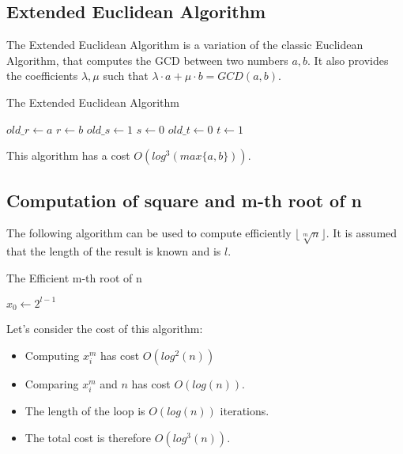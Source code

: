 \subsection{Extended Euclidean Algorithm}
The Extended Euclidean Algorithm is a variation of the classic Euclidean Algorithm, that computes the GCD between two numbers $a, b$. \newline
It also provides the coefficients $\lambda, \mu$ such that $\lambda \cdot a + \mu \cdot b = GCD(a,b)$.\newline
{}
\begin{algorithm}
\caption{The Extended Euclidean Algorithm}\label{alg:ExtEucAlg}
$old\_r \gets a$\;
$r \gets b$\;
$old\_s \gets 1$\;
$s \gets 0$\;
$old\_t \gets 0$\;
$t \gets 1$\;
\end{algorithm}
This algorithm has a cost $O(log^{3}(max\{a, b \}))$.

\subsection{Computation of square and m-th root of n}
The following algorithm can be used to compute efficiently $\lfloor \sqrt[m]{n} \rfloor$.\newline
It is assumed that the length of the result is known and is $l$.\newline
{}
\begin{algorithm}
\caption{The Efficient m-th root of n}\label{alg:m_root}
$x_{0} \gets 2^{l - 1}$\;
\end{algorithm}
Let's consider the cost of this algorithm:
\begin{itemize}
    \item Computing $x_{i}^{m}$ has cost $O(log^{2}(n))$
    \item Comparing $x_{i}^{m}$ and $n$ has cost $O(log(n))$.
    \item The length of the loop is $O(log(n))$ iterations.
    \item The total cost is therefore $O(log^{3}(n))$.
\end{itemize}

